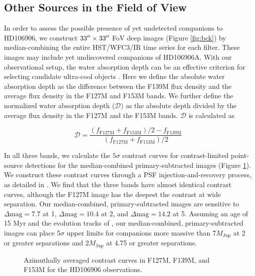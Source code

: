 \documentclass[twocolumn, trackchanges]{aastex62}
\newcommand{\mjup}{\ensuremath{M_\mathrm{Jup}}\xspace}
\begin{document}
\subsection{Other Sources in the Field of View}
In order to assess the possible presence of yet undetected companions to HD106906, we construct $33\mbox{$^{\prime\prime}$}\times33\mbox{$^{\prime\prime}$}$ FoV deep images (Figure \ref{fig:bck}) by median-combining the entire HST/WFC3/IR time series for each filter. These images may include yet undiscovered companions of HD106906A. With our observational setup, the water absorption depth can be an effective criterion for selecting candidate ultra-cool objects \citep[e.g.,][]{Fontanive2018}. Here we define the absolute water absorption depth as the difference between the F139M flux density and the average flux {density} in the F127M and F153M bands. We further define the normalized water absorption depth ($\mathcal{D}$) as the absolute depth divided by the average flux density in the F127M and the F153M bands. $\mathcal{D}$ is calculated as

\begin{equation}
  \label{eqn:water}
\mathcal{D} = \frac{(f_{\mathrm{F127M}} + f_{\mathrm{F153M}})/2 - f_{\mathrm{F139M}}}{(f_{\mathrm{F127M}} + f_{\mathrm{F153M}})/2} 
\end{equation}

In all three bands, we calculate the $5\sigma$ contrast curves for contrast-limited point-source detections for the median-combined primary-subtracted images (Figure \ref{fig:contrast_curve}). We construct these contrast curves through a PSF injection-and-recovery process, as detailed in  \citet{Zhou2019}.  We find that the three bands  have almost identical contrast curves, although the F127M image has the deepest the contrast at wide separation.  Our median-combined, primary-subtracted images are sensitive to $\Delta \mbox{mag}=7.7$ at 1\arcsec, $\Delta \mbox{mag}=10.4$ at 2\arcsec, and $\Delta \mbox{mag}=14.2$ at 5\arcsec. Assuming an age of 15 Myr and the evolution tracks of \citet{Saumon2008}, our median-combined, primary-subtracted images can place 5$\sigma$ upper limits for companions more massive than 7\mjup{} at 2\arcsec{} or greater  separations and 2\mjup{} at 4.75\arcsec{} or greater  separations.

\begin{figure}
  \centering
  \caption{Azimuthally averaged contrast curves in F127M, F139M, and F153M for the HD106906 observations.}
  \label{fig:contrast_curve}
\end{figure}
\end{document}
